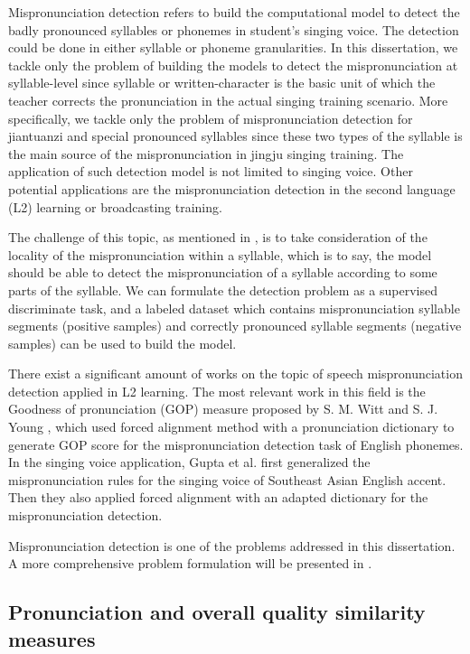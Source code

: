 Mispronunciation detection refers to build the computational model to detect the badly pronounced syllables or phonemes in student's singing voice. The detection could be done in either syllable or phoneme granularities. In this dissertation, we tackle only the problem of building the models to detect the mispronunciation at syllable-level since syllable or written-character is the basic unit of which the teacher corrects the pronunciation in the actual singing training scenario. More specifically, we tackle only the problem of mispronunciation detection for jiantuanzi and special pronounced syllables since these two types of the syllable is the main source of the mispronunciation in jingju singing training. The application of such detection model is not limited to singing voice. Other potential applications are the mispronunciation detection in the second language (L2) learning or broadcasting training.

The challenge of this topic, as mentioned in , is to take consideration of the locality of the mispronunciation within a syllable, which is to say, the model should be able to detect the mispronunciation of a syllable according to some parts of the syllable. We can formulate the detection problem as a supervised discriminate task, and a labeled dataset which contains mispronunciation syllable segments (positive samples) and correctly pronounced syllable segments (negative samples) can be used to build the model.

There exist a significant amount of works on the topic of speech mispronunciation detection applied in L2 learning. The most relevant work in this field is the Goodness of pronunciation (GOP) measure proposed by S. M. Witt and S. J. Young \cite{Witt2000}, which used forced alignment method with a pronunciation dictionary to generate GOP score for the mispronunciation detection task of English phonemes. In the singing voice application, Gupta et al. \cite{Guptac} first generalized the mispronunciation rules for the singing voice of Southeast Asian English accent. Then they also applied forced alignment with an adapted dictionary for the mispronunciation detection.

Mispronunciation detection is one of the problems addressed in this dissertation. A more comprehensive problem formulation will be presented in .

\subsection{Pronunciation and overall quality similarity measures}

